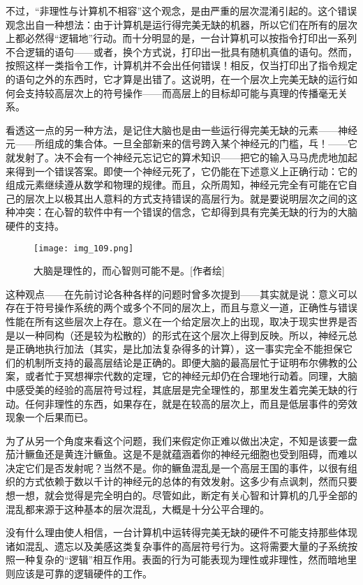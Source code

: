 不过，“非理性与计算机不相容”这个观念，是由严重的层次混淆引起的。这个错误观念出自一种想法：由于计算机是运行得完美无缺的机器，所以它们在所有的层次上都必然得“逻辑地”行动。而十分明显的是，一台计算机可以按指令打印出一系列不合逻辑的语句——或者，换个方式说，打印出一批具有随机真值的语句。然而，按照这样一类指令工作，计算机并不会出任何错误！相反，仅当打印出了指令规定的语句之外的东西时，它才算是出错了。这说明，在一个层次上完美无缺的运行如何会支持较高层次上的符号操作——而高层上的目标却可能与真理的传播毫无关系。

看透这一点的另一种方法，是记住大脑也是由一些运行得完美无缺的元素——神经元——所组成的集合体。一旦全部新来的信号跨入某个神经元的门槛，乓！——它就发射了。决不会有一个神经元忘记它的算术知识——把它的输入马马虎虎地加起来得到一个错误答案。即使一个神经元死了，它仍能在下述意义上正确行动：它的组成元素继续遵从数学和物理的规律。而且，众所周知，神经元完全有可能在它自己的层次上以极其出人意料的方式支持错误的高层行为。就是要说明层次之间的这种冲突：在心智的软件中有一个错误的信念，它却得到具有完美无缺的行为的大脑硬件的支持。

\begin{figure}
\texttt{[image: img\_109.png]}
\caption[大脑的低层与高层之间的冲突。]
  {大脑是理性的，而心智则可能不是。[作者绘]}
\end{figure}

这种观点——在先前讨论各种各样的问题时曾多次提到——其实就是说：意义可以存在于符号操作系统的两个或多个不同的层次上，而且与意义一道，正确性与错误性能在所有这些层次上存在。意义在一个给定层次上的出现，取决于现实世界是否是以一种同构（还是较为松散的）的形式在这个层次上得到反映。所以，神经元总是正确地执行加法（其实，是比加法复杂得多的计算），这一事实完全不能担保它们的机制所支持的最高层结论是正确的。即便大脑的最高层忙于证明布尔佛教的公案，或者忙于冥想禅宗代数的定理，它的神经元却仍在合理地行动着。同理，大脑中感受美的经验的高层符号过程，其底层是完全理性的，那里发生着完美无缺的行动。任何非理性的东西，如果存在，就是在较高的层次上，而且是低层事件的旁效现象一个后果而已。

为了从另一个角度来看这个问题，我们来假定你正难以做出决定，不知是该要一盘茄汁鳜鱼还是黄连汁鳜鱼。这是不是就蕴涵着你的神经元细胞也受到阻碍，而难以决定它们是否发射呢？当然不是。你的鳜鱼混乱是一个高层王国的事件，以很有组织的方式依赖于数以千计的神经元的总体的有效发射。这多少有点讽刺，然而只要想一想，就会觉得是完全明白的。尽管如此，断定有关心智和计算机的几乎全部的混乱都来源于这种基本的层次混乱，大概是十分公平合理的。

没有什么理由使人相信，一台计算机中运转得完美无缺的硬件不可能支持那些体现诸如混乱、遗忘以及美感这类复杂事件的高层符号行为。这将需要大量的子系统按照一种复杂的“逻辑”相互作用。表面的行为可能表现为理性或非理性，然而暗地里则应该是可靠的逻辑硬件的工作。

